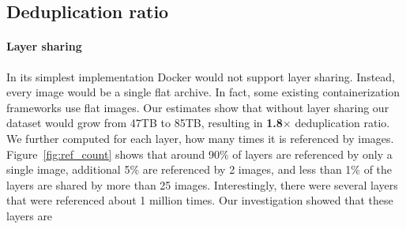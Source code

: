 \subsection{Deduplication ratio} 
\label{sec:dedup_ratio}

%
%
%

\paragraph{Layer sharing}



In its simplest implementation Docker would not support layer sharing.
%
Instead, every image would be a single flat archive.
%
In fact, some existing containerization frameworks  use flat images.
%
Our estimates show that without layer sharing our dataset would grow from 47TB
to 85TB, resulting in \textbf{1.8$\times$} deduplication ratio.
% 
We further computed for each layer, how many times it is referenced by images.
%
Figure~\ref{fig:ref_count} shows that around 90\% of layers are referenced by
only a single image, additional 5\% are referenced by 2 images, and less than
1\% of the layers are shared by more than 25 images.
%
%
%
%
%
%
%
Interestingly, there were several layers that were referenced about 1 million
times.
%
Our investigation showed  that these layers are~

